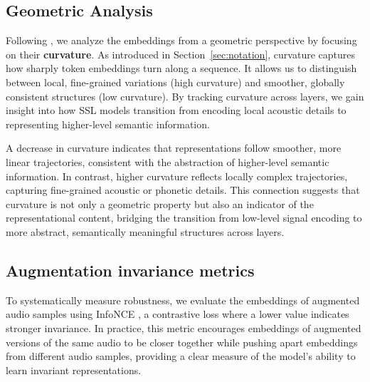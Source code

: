 \documentclass[5p]{elsarticle}
\begin{document}
\subsection{Geometric Analysis}

Following \cite{hosseini2023large}, we analyze the embeddings from a geometric perspective by focusing on their \textbf{curvature}.  
As introduced in Section~\ref{sec:notation}, curvature captures how sharply token embeddings turn along a sequence.  
It allows us to distinguish between local, fine-grained variations (high curvature) and smoother, globally consistent structures (low curvature).  
By tracking curvature across layers, we gain insight into how SSL models transition from encoding local acoustic details to representing higher-level semantic information.

A decrease in curvature indicates that representations follow smoother, more linear trajectories, consistent with the abstraction of higher-level semantic information. In contrast, higher curvature reflects locally complex trajectories, capturing fine-grained acoustic or phonetic details. This connection suggests that curvature is not only a geometric property but also an indicator of the representational content, bridging the transition from low-level signal encoding to more abstract, semantically meaningful structures across layers.

\subsection{Augmentation invariance metrics}

To systematically measure robustness, we evaluate the embeddings of augmented audio samples using InfoNCE \citep{oord2018representation}, a contrastive loss where a lower value indicates stronger invariance. In practice, this metric encourages embeddings of augmented versions of the same audio to be closer together while pushing apart embeddings from different audio samples, providing a clear measure of the model's ability to learn invariant representations.

\end{document}
